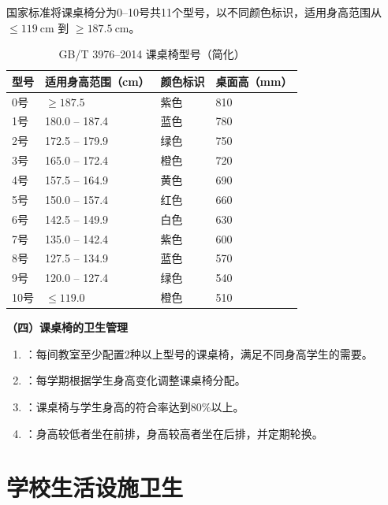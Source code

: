 \begin{keybox}
国家标准将课桌椅分为0--10号共11个型号，以不同颜色标识，适用身高范围从 $\leq 119\ \mathrm{cm}$ 到 $\geq 187.5\ \mathrm{cm}$。

\begin{table}[H]
\centering
\caption{GB/T 3976--2014 课桌椅型号（简化）}
\begin{tabularx}{\textwidth}{llXl}
\hline
\textbf{型号} & \textbf{适用身高范围（cm）} & \textbf{颜色标识} & \textbf{桌面高（mm）} \\
\hline
0号  & $\geq 187.5$ & 紫色 & 810 \\
1号  & 180.0 -- 187.4 & 蓝色 & 780 \\
2号  & 172.5 -- 179.9 & 绿色 & 750 \\
3号  & 165.0 -- 172.4 & 橙色 & 720 \\
4号  & 157.5 -- 164.9 & 黄色 & 690 \\
5号  & 150.0 -- 157.4 & 红色 & 660 \\
6号  & 142.5 -- 149.9 & 白色 & 630 \\
7号  & 135.0 -- 142.4 & 紫色 & 600 \\
8号  & 127.5 -- 134.9 & 蓝色 & 570 \\
9号  & 120.0 -- 127.4 & 绿色 & 540 \\
10号 & $\leq 119.0$ & 橙色 & 510 \\
\hline
\end{tabularx}
\end{table}

\textbf{（四）课桌椅的卫生管理}

\begin{enumerate}[leftmargin=*]
    \item {}：每间教室至少配置2种以上型号的课桌椅，满足不同身高学生的需要。
    \item {}：每学期根据学生身高变化调整课桌椅分配。
    \item {}：课桌椅与学生身高的符合率达到80\%以上。
    \item {}：身高较低者坐在前排，身高较高者坐在后排，并定期轮换。
\end{enumerate}
\end{keybox}

\section{学校生活设施卫生}

